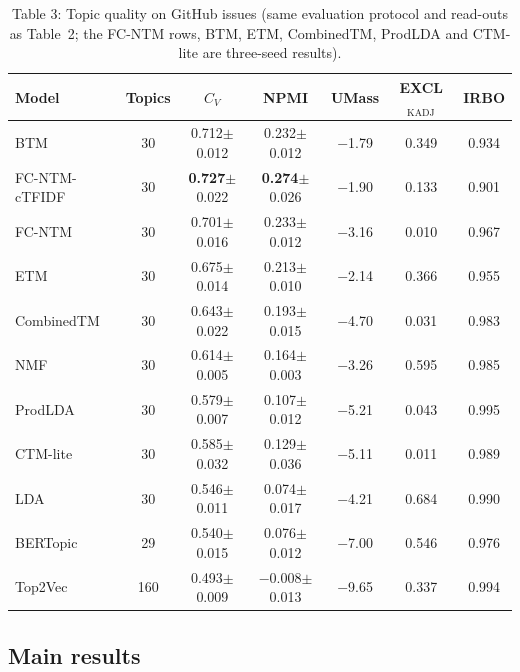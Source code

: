 \documentclass{article}
\begin{document}
\begin{table}[t]
\centering
\caption{Table 3: Topic quality on GitHub issues (same evaluation protocol and read-outs as Table~2; the FC-NTM rows, BTM, ETM, CombinedTM, ProdLDA and CTM-lite are three-seed results).}
\label{tab:github}
\small
\begin{tabular}{lcccccc}
\toprule
Model & Topics & $C_V$ & NPMI & UMass & EXCL$_{\mathrm{KADJ}}$ & IRBO \\
\midrule
BTM & 30 & 0.712$\pm$0.012 & 0.232$\pm$0.012 & $-$1.79 & 0.349 & 0.934 \\
FC-NTM-cTFIDF & 30 & \textbf{0.727}$\pm$0.022 & \textbf{0.274}$\pm$0.026 & $-$1.90 & 0.133 & 0.901 \\
FC-NTM & 30 & 0.701$\pm$0.016 & 0.233$\pm$0.012 & $-$3.16 & 0.010 & 0.967 \\
ETM & 30 & 0.675$\pm$0.014 & 0.213$\pm$0.010 & $-$2.14 & 0.366 & 0.955 \\
CombinedTM & 30 & 0.643$\pm$0.022 & 0.193$\pm$0.015 & $-$4.70 & 0.031 & 0.983 \\
NMF & 30 & 0.614$\pm$0.005 & 0.164$\pm$0.003 & $-$3.26 & 0.595 & 0.985 \\
ProdLDA & 30 & 0.579$\pm$0.007 & 0.107$\pm$0.012 & $-$5.21 & 0.043 & 0.995 \\
CTM-lite & 30 & 0.585$\pm$0.032 & 0.129$\pm$0.036 & $-$5.11 & 0.011 & 0.989 \\
LDA & 30 & 0.546$\pm$0.011 & 0.074$\pm$0.017 & $-$4.21 & 0.684 & 0.990 \\
BERTopic & 29 & 0.540$\pm$0.015 & 0.076$\pm$0.012 & $-$7.00 & 0.546 & 0.976 \\
Top2Vec & 160 & 0.493$\pm$0.009 & $-$0.008$\pm$0.013 & $-$9.65 & 0.337 & 0.994 \\
\bottomrule
\end{tabular}
\end{table}

\subsection{Main results}
\end{document}
